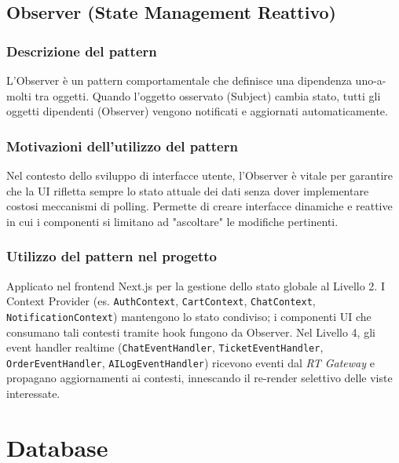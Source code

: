 \documentclass[a4paper, 11pt, oneside]{scrartcl}
\begin{document}
\subsection{Observer (State Management Reattivo)}

\subsubsection{Descrizione del pattern}
L'Observer è un pattern comportamentale che definisce una dipendenza uno-a-molti tra oggetti. Quando l'oggetto osservato (Subject) cambia stato, tutti gli oggetti dipendenti (Observer) vengono notificati e aggiornati automaticamente.

\subsubsection{Motivazioni dell'utilizzo del pattern}
Nel contesto dello sviluppo di interfacce utente, l'Observer è vitale per garantire che la UI rifletta sempre lo stato attuale dei dati senza dover implementare costosi meccanismi di polling. Permette di creare interfacce dinamiche e reattive in cui i componenti si limitano ad "ascoltare" le modifiche pertinenti.

\subsubsection{Utilizzo del pattern nel progetto}
Applicato nel frontend Next.js per la gestione dello stato globale al Livello 2. I Context Provider (es. \texttt{AuthContext}, \texttt{CartContext}, \texttt{ChatContext}, \texttt{NotificationContext}) mantengono lo stato condiviso; i componenti UI che consumano tali contesti tramite hook fungono da Observer. Nel Livello 4, gli event handler realtime (\texttt{ChatEventHandler}, \texttt{TicketEventHandler}, \texttt{OrderEventHandler}, \texttt{AILogEventHandler}) ricevono eventi dal \textit{RT Gateway} e propagano aggiornamenti ai contesti, innescando il re-render selettivo delle viste interessate.

\newpage
\section{Database}
\end{document}

